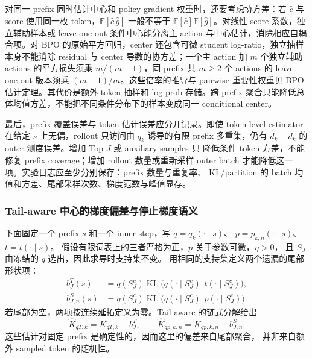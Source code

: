 \documentclass[lang=cn,scheme=chinese,openany]{../book/elegantbook}
\newcommand{\E}{\mathbb E}
\newcommand{\KL}{\operatorname{KL}}
\begin{document}
对同一 prefix 同时估计中心和 policy-gradient 权重时，还要考虑协方差：若 $\widehat c$ 与 score 使用同一枚 token，$\E[\widehat c\,\widehat g]$ 一般不等于 $\E[\widehat c]\E[\widehat g]$。对线性 score 系数，独立辅助样本或 leave-one-out 条件中心能分离主 action 与中心估计，消除相应自耦合项。对 BPO 的原始平方回归，center 还包含可微 student log-ratio，独立抽样本身不能消除 residual 与 center 导数的协方差；一个主 action 加 $m$ 个独立辅助 actions 的平方损失须乘 $m/(m+1)$，同 prefix 共 $m\ge2$ 个 actions 的 leave-one-out 版本须乘 $(m-1)/m$。这些倍率的推导与 pairwise 重要性权重见 BPO 估计定理。其代价是额外 token 抽样和 log-prob 存储。跨 prefix 聚合只能降低总体均值方差，不能把不同条件分布下的样本变成同一 conditional center。

最后，prefix 覆盖误差与 token 估计误差应分开记录。即使 token-level estimator 在给定 $s$ 上无偏，rollout 只访问由 $q_k$ 诱导的有限 prefix 多重集，仍有 $\widehat d_k-d_k$ 的 outer 测度误差。增加 Top-$J$ 或 auxiliary samples 只 降低条件 token 方差，不能修复 prefix coverage；增加 rollout 数量或重新采样 outer batch 才能降低这一项。实验日志应至少分别保存：prefix 数量与重复率、 KL/partition 的 batch 均值和方差、尾部采样次数、梯度范数与峰值显存。



\subsubsection*{Tail-aware 中心的梯度偏差与停止梯度语义}

下面固定一个 prefix $s$ 和一个 inner step，写 $q=q_k(\cdot\mid s)$、 $p=p_{k,n}(\cdot\mid s)$、$t=t(\cdot\mid s)$。 假设有限词表上的三者严格为正，$p$ 关于参数可微，$\eta>0$， 且 $S_J$ 由冻结的 $q$ 选出，因此求导时支持集不变。 用相同的支持集定义两个遗漏的尾部形状项：
\begin{align}
 b_J^T(s)&=q(S_J^c)\KL\bigl(q(\cdot\mid S_J^c)\Vert t(\cdot\mid S_J^c)\bigr),\\
 b_{J,n}^S(s)&=q(S_J^c)\KL\bigl(q(\cdot\mid S_J^c)\Vert p(\cdot\mid S_J^c)\bigr).
\end{align}
若尾部为空，两项按连续延拓定义为零。Tail-aware 的链式分解给出
\begin{equation}
 \widehat K_{qT,k}=K_{qT,k}-b_J^T,
 \qquad
 \widehat K_{qp,k,n}=K_{qp,k,n}-b_{J,n}^S.
\end{equation}
这些估计对固定 prefix 是确定性的，因而这里的偏差来自尾部聚合， 并非来自额外 sampled token 的随机性。
\end{document}
